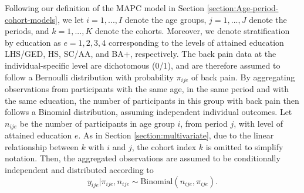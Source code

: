 Following our definition of the MAPC model in Section \ref{section:Age-period-cohort-models}, we let $i=1,...,I$ denote the age groups, $j = 1,...,J$ denote the periods, and $k=1,...,K$ denote the cohorts. Moreover, we denote stratification by education as $e=1,2,3,4$ corresponding to the levels of attained education LHS/GED, HS, SC/AA, and BA+, respectively. The back pain data at the individual-specific level are dichotomous ($0$/$1$), and are therefore assumed to follow a Bernoulli distribution with probability $\pi_{ije}$ of back pain. By aggregating observations from participants with the same age, in the same period and with the same education, the number of participants in this group with back pain then follows a Binomial distribution, assuming independent individual outcomes. Let $n_{ije}$ be the number of participants in age group $i$, from period $j$, with level of attained education $e$. As in Section \ref{section:multivariate}, due to the linear relationship between $k$ with $i$ and $j$, the cohort index $k$ is omitted to simplify notation. Then, the aggregated observations are assumed to be conditionally independent and distributed according to
\begin{equation}
    y_{ije}|\pi_{ije},n_{ije} \sim \text{Binomial}(n_{ije}, \pi_{ije}).
    \label{eqn:Binom-Likelihood}
\end{equation}
